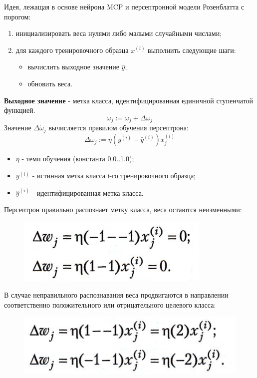 \documentclass{beamer}
\begin{document}
\begin{frame}[t]
Идея, лежащая в основе нейрона MCP и персептронной модели Розенблатта с порогом:
\begin{enumerate}
\item инициализировать веса нулями либо малыми случайными числами;
\item для каждого тренировочного образца $x^{(i)}$ выполнить следующие шаги:
\begin{itemize}
\item вычислить выходное значение $\hat{y}$;
\item обновить веса.
\end{itemize}
\end{enumerate}
\textbf{Выходное значение} - метка класса, идентифицированная единичной
ступенчатой функцией.
\[\omega_j := \omega_j + \Delta\omega_j\]
Значение $\Delta\dot\omega_j$ вычисляется правилом обучения персептрона:
\[\Delta\omega_j := \eta(y^{(i)} - \hat{y}^{(i)})x^{(i)}_j \]
\begin{itemize}
\item $\eta$ - темп обучения (константа 0.0..1.0);
\item $y^{(i)}$ - истинная метка класса i-го тренировочного образца;
\item $\hat{y}^{(i)}$ - идентифицированная метка класса. 
\end{itemize}
\end{frame}

\begin{frame}[t]
Персептрон правильно распознает метку класса, веса остаются неизменными:
\begin{figure}[h]
\centering
\includegraphics[scale=0.5]{images/lec03-pic06.png}
\end{figure}
В случае неправильного распознавания веса продвигаются в направлении
соответственно положительного или отрицательного целевого класса:
\begin{figure}[h]
\centering
\includegraphics[scale=0.5]{images/lec03-pic07.png}
\end{figure}
\end{frame}
\end{document}
